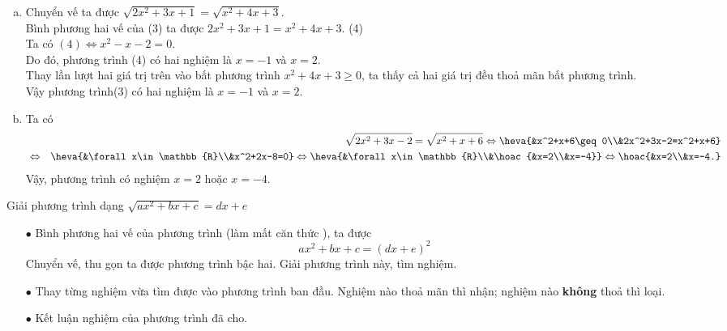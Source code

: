 \begin{vd}
{\begin{enumerate}[a)]
	Ta có $(2)\Leftrightarrow x^2-7x=0$.\\
	Do đó, phương trình (2) có hai nghiệm là $x=0$ và $x=7$.\\
	Thay lần lượt hai giá trị trên vào bất phương trình $x-4\geq 0$, ta thấy chỉ có $x=7$ thoả mãn bất phương trình.\\
	Vậy nghiệm của phương trình (1) là $x=7$.
	\item Chuyển vế ta được $\sqrt{2x^2+3x+1}=\sqrt{x^2+4x+3}$.\\
	Bình phương hai vế của (3) ta được $2x^2+3x+1=x^2+4x+3$. \hfill (4)\\
	Ta có $(4)\Leftrightarrow x^2-x-2=0$.\\
	Do đó, phương trình (4) có hai nghiệm là $x=-1$ và $x=2$.\\
	Thay lần lượt hai giá trị trên vào bất phương trình $x^2+4x+3\geq 0$, ta thấy cả hai giá trị đều thoả mãn bất phương trình.\\
	Vậy phương trình(3) có hai nghiệm là $x=-1$ và $x=2$.
	\item Ta có
	\begin{eqnarray*}
		&& \sqrt{2x^2+3x-2}=\sqrt{x^2+x+6}\Leftrightarrow \heva{&x^2+x+6\geq 0\\&2x^2+3x-2=x^2+x+6}\\
		&\Leftrightarrow & \heva{&\forall x\in \mathbb{R}\\&x^2+2x-8=0}\Leftrightarrow  \heva{&\forall x\in \mathbb{R}\\&\hoac{&x=2\\&x=-4}}\Leftrightarrow \hoac{&x=2\\&x=-4.}
	\end{eqnarray*}
	Vậy, phương trình có nghiệm $x=2$ hoặc $x=-4$.
\end{enumerate}}
\end{vd}
\begin{dang}{Giải phương trình dạng $\sqrt{ax^2+bx+c}=dx+e$}
	\begin{itemize}
		\item [$\bullet$] Bình phương hai vế của phương trình (làm mất căn thức ), ta được
		$$ax^2+bx+c=(dx+e)^2$$
		Chuyển vế, thu gọn ta được phương trình bậc hai. Giải phương trình này, tìm nghiệm.
		\item [$\bullet$] Thay từng nghiệm vừa tìm được vào phương trình ban đầu. Nghiệm nào thoả mãn thì nhận; nghiệm nào \textbf{không} thoả thì loại.
		\item [$\bullet$] Kết luận nghiệm của phương trình đã cho.
	\end{itemize}
\end{dang}

